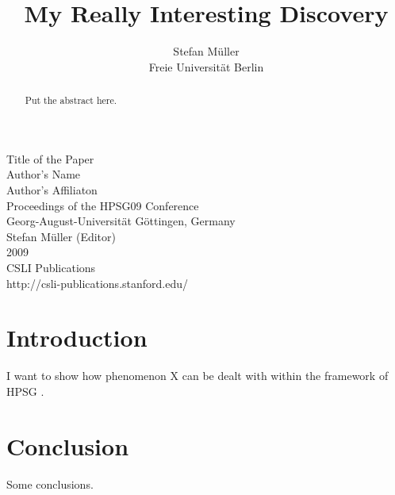\documentclass[11pt,a4paper,fleqn,draft]{article}
\title{My Really Interesting Discovery}
\author{Stefan M{\"u}ller\\
Freie Universit{\"a}t Berlin}
\begin{document}

\begin{center}
\Large
Title of the Paper\\[\baselineskip]

Author's Name\\[\baselineskip]
Author's Affiliaton\\[3\baselineskip]

                Proceedings of the HPSG09 Conference\\[\baselineskip]

                       Georg-August-Universität G{\"o}ttingen, Germany\\[\baselineskip]

                        Stefan M{\"u}ller (Editor)\\[\baselineskip]

                                2009\\[\baselineskip]

                          CSLI Publications\\[\baselineskip]

              http://csli-publications.stanford.edu/

\end{center}

\newpage

\begin{abstract}
Put the abstract here.
\end{abstract}

\setcounter{footnote}{2}
\renewcommand{\thefootnote}{\fnsymbol{footnote}}
\renewcommand{\thefootnote}{\arabic{footnote}}
\setcounter{footnote}{0}


\section{Introduction}

I want to show how phenomenon X can be dealt with within the framework of HPSG
\citep{PS87a,PS94a}.

\section{Conclusion}

Some conclusions.



 

\end{document}
